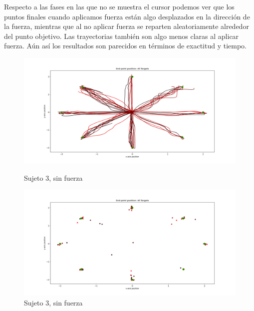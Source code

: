 \documentclass[a4paper,11pt, oneside]{book}
\begin{document}
Respecto a las fases en las que no se muestra el cursor podemos ver que los puntos finales cuando aplicamos fuerza están algo desplazados en la dirección de la fuerza, mientras que al no aplicar fuerza se reparten aleatoriamente alrededor del punto objetivo. Las trayectorias también son algo menos claras al aplicar fuerza. Aún así los resultados son parecidos en términos de exactitud y tiempo.

\begin{figure}[H]
	\begin{minipage}[b]{0.5\linewidth}
		\centering
		\includegraphics[width=\linewidth]{sujeto3/no_force/trayectorias}
		\caption{Sujeto 3, sin fuerza}
		\label{fig:figura1}
	\end{minipage}
	\hspace{0.5cm}
	\begin{minipage}[b]{0.5\linewidth}
		\centering
		\includegraphics[width=\linewidth]{sujeto3/no_force/trayectorias_puntos}
		\caption{Sujeto 3, sin fuerza}
		\label{fig:figura2}
	\end{minipage}
\end{figure}
\end{document}
